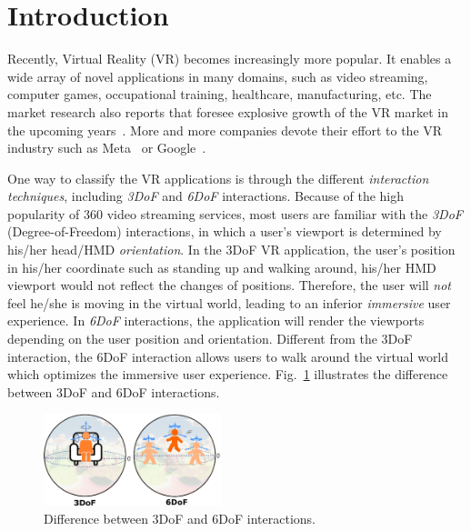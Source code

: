 \section{Introduction} \label{sec:intro}

Recently, Virtual Reality (VR) becomes increasingly more popular.
It enables a wide array of novel applications in many domains, such as video streaming, computer games, occupational training, healthcare, manufacturing, etc.
The market research also reports that foresee explosive growth of the VR market in the upcoming years~\cite{XR_market}.
More and more companies devote their effort to the VR industry such as Meta~\cite{Meta} or Google~\cite{google_AR_VR, MJRD+20}.

One way to classify the VR applications is through the different {\em interaction techniques}, including {\em 3DoF} and {\em 6DoF} interactions.
Because of the high popularity of 360{\degree} video streaming services, most users are familiar with the {\em 3DoF} (Degree-of-Freedom) interactions, in which a user's viewport is determined by his/her head/HMD {\em orientation}.
In the 3DoF VR application, the user's position in his/her coordinate such as standing up and walking around, his/her HMD viewport would not reflect the changes of positions.
Therefore, the user will {\em not} feel he/she is moving in the virtual world, leading to an inferior {\em immersive} user experience.
In {\em 6DoF} interactions, the application will render the viewports depending on the user position and orientation. 
Different from the 3DoF interaction, the 6DoF interaction allows users to walk around the virtual world which optimizes the immersive user experience.
Fig.~\ref{fig:vr_phase} illustrates the difference between 3DoF and 6DoF interactions.

\begin{figure}[tbh]
    \centering
    \includegraphics[width=0.46\textwidth]{figs/vr_phase}
    \caption{Difference between 3DoF and 6DoF interactions.}
    \label{fig:vr_phase}
\end{figure}

